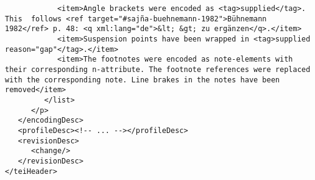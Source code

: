 \documentclass[article,12pt,a4paper]{memoir}%
\begin{document}
\begin{verbatim}
            <item>Angle brackets were encoded as <tag>supplied</tag>. This 	follows <ref target="#sajña-buehnemann-1982">Bühnemann 1982</ref> p. 48: <q xml:lang="de">&lt; &gt; zu ergänzen</q>.</item>
            <item>Suspension points have been wrapped in <tag>supplied reason="gap"</tag>.</item>
            <item>The footnotes were encoded as note-elements with their corresponding n-attribute. The footnote references were replaced with the corresponding note. Line brakes in the notes have been removed</item>
         </list>
      </p>
   </encodingDesc>
   <profileDesc><!-- ... --></profileDesc>
   <revisionDesc>
      <change/>
   </revisionDesc>
</teiHeader>
	 \end{verbatim}
       
      \clearpage
      \begin{english}
      \printshorthands
      \printbibliography
      \end{english}
    
\end{document}
